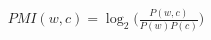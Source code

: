 \documentclass[preview]{standalone}
\begin{document}
\begin{align*}
PMI(w,c)=\log_2\bigl(\tfrac{P(w,c)}{P(w)P(c)}\bigr)
\end{align*}
\end{document}
